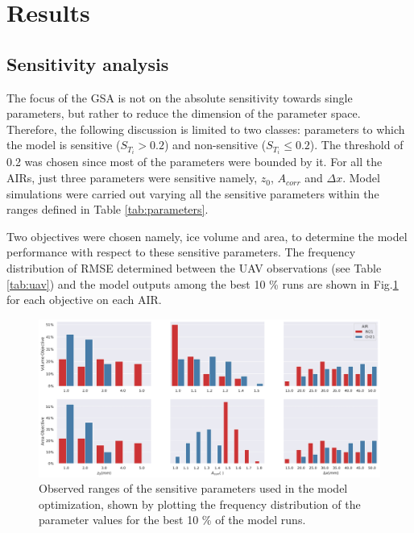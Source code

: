 \documentclass[utf8]{frontiersSCNS} %
\begin{document}
\section{Results}

\subsection{Sensitivity analysis}

The focus of the GSA is not on the absolute sensitivity towards single parameters, but rather to reduce the
dimension of the parameter space. Therefore, the following discussion is limited to two classes: parameters to
which the model is sensitive ($S_{T_{i}} > 0.2$) and non-sensitive ($S_{T_{i}} \leq 0.2$). The threshold of 0.2 was
chosen since most of the parameters were bounded by it. For all the AIRs, just three parameters were sensitive
namely, $z_{0}$, $A_{corr}$ and $\Delta x$. Model simulations were carried out varying all the sensitive parameters
within the ranges defined in Table \ref{tab:parameters}.

Two objectives were chosen namely, ice volume and area, to determine the model performance with respect to these
sensitive parameters. The frequency distribution  of RMSE determined between the UAV observations (see Table
\ref{tab:uav}) and the model outputs among the best 10 \% runs are shown in Fig.\ref{fig:param_hist} for each objective
on each AIR.

\begin{figure}
	\begin{center}
		\includegraphics[width=\linewidth]{Figures/param_hist.jpg}
	\end{center}
	\caption{Observed ranges of the sensitive parameters used in the model optimization, shown by
		plotting the frequency distribution of the parameter values for the best 10 \% of the model runs. }
	\label{fig:param_hist}
\end{figure}
\end{document}
